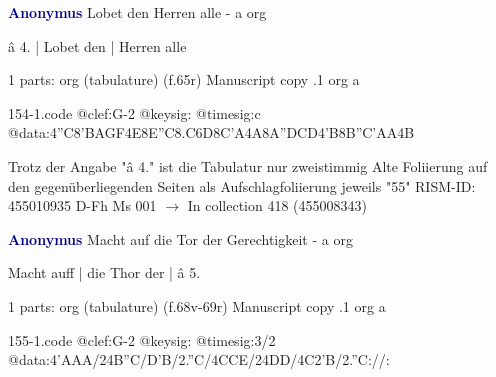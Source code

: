 \documentclass[twocolumn]{book}
\begin{document}
\newline \par \vspace{7pt} \textcolor{darkblue}{\textbf{Anonymus  }}
\newline Lobet den Herren alle - a
\newline org
\newline \begin{itshape}[f.65r, at left:] â 4. | Lobet den | Herren alle\end{itshape} 
\newline \textcolor{darkblue}{}  1 parts: org (tabulature)  (f.65r)
\newline Manuscript copy
.1  org  a  
\begin{filecontents*}{154-1.code}
@clef:G-2
@keysig:
@timesig:c
@data:4''C{8'BA}{GF}4E{8E''C8.C6D}{8C'A}4A{8A''DCD}4'B{8B''C}{'AA}4B
\end{filecontents*}
\newline
%

\newline Trotz der Angabe "â 4." ist die Tabulatur nur zweistimmig
\newline Alte Foliierung auf den gegenüberliegenden Seiten als Aufschlagfoliierung jeweils "55"
\newline RISM-ID: 455010935
\newline D-Fh  Ms 001
\newline $\rightarrow$ In collection 418 (455008343)
      
\newline \par \vspace{7pt} \textcolor{darkblue}{\textbf{Anonymus  }}
\newline Macht auf die Tor der Gerechtigkeit - a
\newline org
\newline \begin{itshape}[f.68v, at left:] Macht auff | die Thor der | â 5.\end{itshape} 
\newline \textcolor{darkblue}{}  1 parts: org (tabulature)  (f.68v-69r)
\newline Manuscript copy
.1  org  a  
\begin{filecontents*}{155-1.code}
@clef:G-2
@keysig:
@timesig:3/2
@data:4'AAA/24B''C/D'B/2.''C/4CCE/24DD/4C2'B/2.''C://:
\end{filecontents*}
\newline
%
\end{document}
